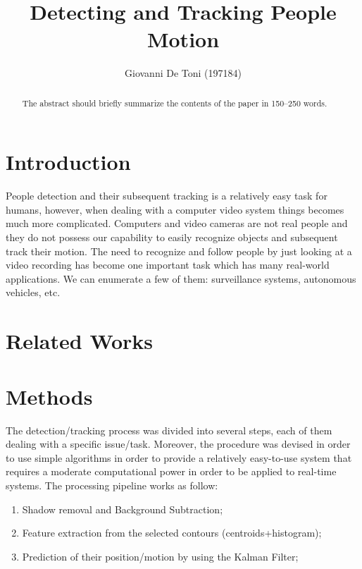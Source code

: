 \documentclass[runningheads]{llncs}
\begin{document}
%
\title{Detecting and Tracking People Motion}
%
%
\author{Giovanni De Toni (197184)}
%
%
%
\maketitle              %
%
\begin{abstract}
The abstract should briefly summarize the contents of the paper in
150--250 words.

\end{abstract}
%
%
%
\section{Introduction}
People detection and their subsequent tracking is a relatively easy task for humans, however, when dealing with a computer video system things becomes much more complicated. Computers and video cameras are not real people and they do not possess our capability to easily recognize objects and subsequent track their motion.  The need to recognize and follow people by just looking at a video recording has become one important task which has many real-world applications. We can enumerate a few of them: surveillance systems, autonomous vehicles, etc. 

\section{Related Works}

\section{Methods}

The detection/tracking process was divided into several steps, each of them dealing with a specific issue/task. Moreover, the procedure was devised in order to use simple algorithms in order to provide a relatively easy-to-use system that requires a moderate computational power in order to be applied to real-time systems. The processing pipeline works as follow:
\begin{enumerate}
\item Shadow removal and Background Subtraction;
\item Feature extraction from the selected contours (centroids+histogram);
\item Prediction of their position/motion by using the Kalman Filter;
\end{enumerate}
\end{document}
